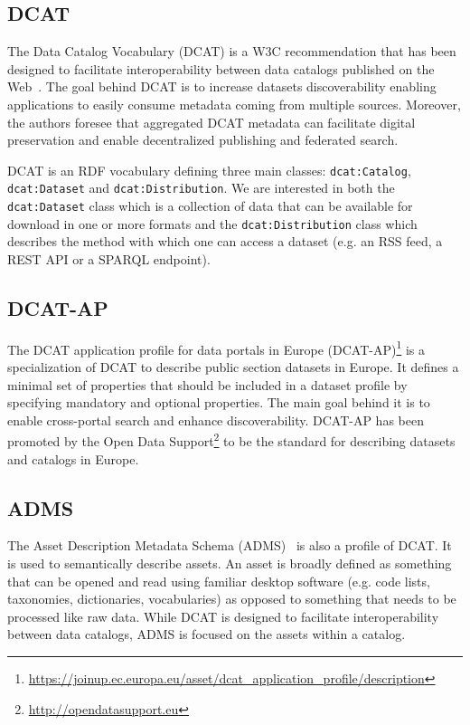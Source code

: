 \subsection{DCAT}
The Data Catalog Vocabulary (DCAT) is a W3C recommendation that has been designed to facilitate interoperability between data catalogs published on the Web~\cite{Erickson:DCV:14}. The goal behind DCAT is to increase datasets discoverability enabling applications to easily consume metadata coming from multiple sources. Moreover, the authors foresee that aggregated DCAT metadata can facilitate digital preservation and enable decentralized publishing and federated search.

DCAT is an RDF vocabulary defining three main classes: \texttt{dcat:Catalog}, \texttt{dcat:Dataset} and \texttt{dcat:Distribution}. We are interested in both the \texttt{dcat:Dataset} class which is a collection of data that can be available for download in one or more formats and the \texttt{dcat:Distribution} class which describes the method with which one can access a dataset (e.g. an RSS feed, a REST API or a SPARQL endpoint).

\subsection{DCAT-AP}
The DCAT application profile for data portals in Europe (DCAT-AP)\footnote{\url{https://joinup.ec.europa.eu/asset/dcat\_application\_profile/description}} is a specialization of DCAT to describe public section datasets in Europe. It defines a minimal set of properties that should be included in a dataset profile by specifying mandatory and optional properties. The main goal behind it is to enable cross-portal search and enhance discoverability. DCAT-AP has been promoted by the Open Data Support\footnote{\url{http://opendatasupport.eu}} to be the standard for describing datasets and catalogs in Europe.

\subsection{ADMS}
The Asset Description Metadata Schema (ADMS)~\cite{Archer:W3C:13} is also a profile of DCAT. It is used to semantically describe assets. An asset is broadly defined as something that can be opened and read using familiar desktop software (e.g. code lists, taxonomies, dictionaries, vocabularies) as opposed to something that needs to be processed like raw data. While DCAT is designed to facilitate interoperability between data catalogs, ADMS is focused on the assets within a catalog.

